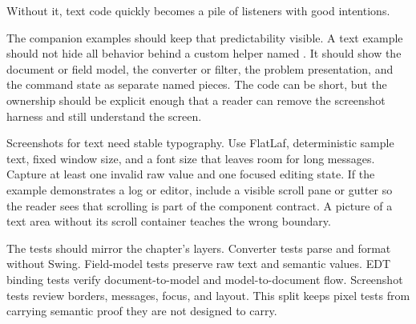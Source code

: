 Without it, text code quickly becomes a pile of listeners with good intentions.

The companion examples should keep that predictability visible. A text example
should not hide all behavior behind a custom helper named .
It should show the document or field model, the converter or filter, the
problem presentation, and the command state as separate named pieces. The code
can be short, but the ownership should be explicit enough that a reader can
remove the screenshot harness and still understand the screen.

Screenshots for text need stable typography. Use FlatLaf, deterministic sample
text, fixed window size, and a font size that leaves room for long messages.
Capture at least one invalid raw value and one focused editing state. If the
example demonstrates a log or editor, include a visible scroll pane or gutter
so the reader sees that scrolling is part of the component contract. A picture
of a text area without its scroll container teaches the wrong boundary.

The tests should mirror the chapter's layers. Converter tests parse and format
without Swing. Field-model tests preserve raw text and semantic values. EDT
binding tests verify document-to-model and model-to-document flow. Screenshot
tests review borders, messages, focus, and layout. This split keeps pixel tests
from carrying semantic proof they are not designed to carry.

